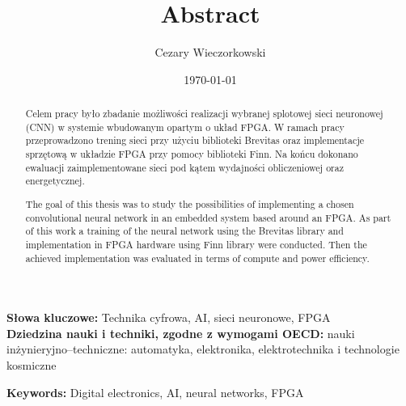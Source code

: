 \documentclass[../main.tex]{subfiles}
\author{Cezary Wieczorkowski}
\date{\today}
\title{Abstract}
\begin{document}
\begin{abstract}
Celem pracy było zbadanie możliwości realizacji wybranej splotowej sieci neuronowej (CNN) w systemie wbudowanym opartym o układ FPGA. W ramach pracy przeprowadzono trening sieci przy 
użyciu biblioteki Brevitas oraz implementacje sprzętową w układzie FPGA przy pomocy biblioteki Finn. Na końcu dokonano ewaluacji zaimplementowane sieci pod kątem wydajności obliczeniowej oraz energetycznej.
\end{abstract}
\textbf{Słowa kluczowe:} Technika cyfrowa, AI, sieci neuronowe, FPGA \\
\textbf{Dziedzina nauki i techniki, zgodne z wymogami OECD:} nauki inżynieryjno--techniczne: automatyka, elektronika, elektrotechnika i technologie kosmiczne
\newpage
{}
\begin{abstract}
The goal of this thesis was to study the possibilities of implementing a chosen convolutional neural network in an embedded system based around an FPGA. As part of this work a training of the neural network using the Brevitas
library and implementation in FPGA hardware using Finn library were conducted. Then the achieved implementation was evaluated in terms of compute and power efficiency.
\end{abstract}
\textbf{Keywords:} Digital electronics, AI, neural networks, FPGA \\
\end{document}
